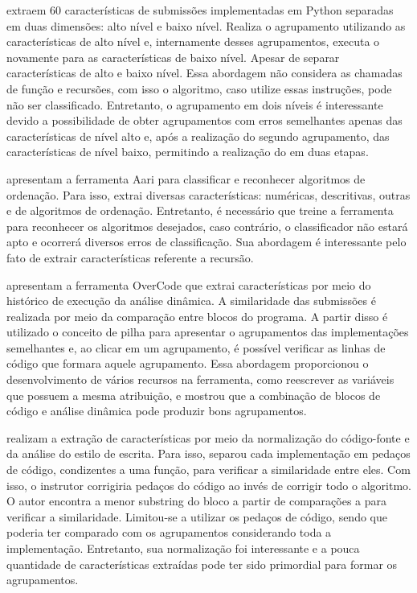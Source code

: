 	 extraem 60 características de submissões implementadas
	em Python separadas em duas dimensões: alto nível e baixo nível. Realiza o agrupamento
	utilizando as características de alto nível e, internamente desses agrupamentos,
	executa o  novamente para as características de baixo nível. Apesar
	de separar características de alto e baixo nível. Essa abordagem não considera as
	chamadas de função e recursões, com isso o algoritmo, caso utilize essas instruções,
	pode não ser classificado. Entretanto, o agrupamento em dois níveis é interessante
	devido a possibilidade de obter agrupamentos com erros semelhantes apenas das
	características de nível alto e, após a realização do segundo agrupamento, das
	características de nível baixo, permitindo a realização do  em
	duas etapas.
	
	 apresentam a ferramenta Aari para classificar e reconhecer
	algoritmos de ordenação. Para isso, extrai diversas características: numéricas,
	descritivas, outras e de algoritmos de ordenação. Entretanto, é necessário que
	treine a ferramenta para reconhecer os algoritmos desejados, caso contrário, o
	classificador não estará apto e ocorrerá diversos erros de classificação. Sua
	abordagem é interessante pelo fato de extrair características referente a recursão.
	
	 apresentam a ferramenta OverCode que extrai características
	por meio do histórico de execução da análise dinâmica. A similaridade das submissões
	é realizada por meio da comparação entre blocos do programa. A partir disso é utilizado
	o conceito de pilha para apresentar o agrupamentos das implementações semelhantes e,
	ao clicar em um agrupamento, é possível verificar as linhas de código que formara
	aquele agrupamento. Essa abordagem proporcionou o desenvolvimento de vários recursos
	na ferramenta, como reescrever as variáveis que possuem a mesma atribuição, e mostrou
	que a combinação de blocos de código e análise dinâmica pode produzir bons agrupamentos.
	
	 realizam a extração de características por meio da normalização
	do código-fonte e da análise do estilo de escrita. Para isso, separou cada implementação
	em pedaços de código, condizentes a uma função, para verificar a similaridade entre eles.
	Com isso, o instrutor corrigiria pedaços do código ao invés de corrigir todo o algoritmo.
	O autor encontra a menor substring do bloco a partir de comparações  a
	 para verificar a similaridade. Limitou-se a utilizar os pedaços de
	código, sendo que poderia ter comparado com os agrupamentos considerando toda a
	implementação. Entretanto, sua normalização foi interessante e a pouca quantidade de
	características extraídas pode ter sido primordial para formar os agrupamentos.
	
